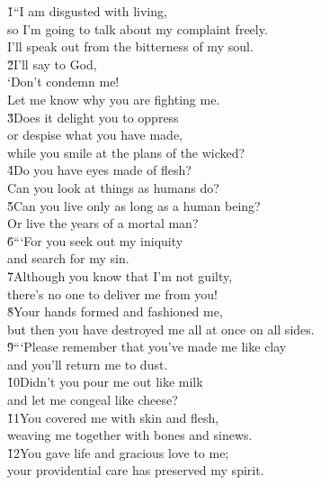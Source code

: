 \begin{poetry}
\poeml {}
\v{1}``I am disgusted with living, \\
\poemll    so I'm going to talk about my complaint freely. \\
\poemlll       I'll speak out from the bitterness of my soul. \\
\poeml \v{2}I'll say to God, \\
\poemll    `Don't condemn me! \\
\poemlll       Let me know why you are fighting me. \\
\poeml \v{3}Does it delight you to oppress \\
\poemll    or despise what you have made, \\
\poemlll       while you smile at the plans of the wicked? \\
\poeml \v{4}Do you have eyes made of flesh? \\
\poemll    Can you look at things as humans do? \\
\poeml \v{5}Can you live only as long as a human being? \\
\poemll    Or live the years of a mortal man? \\
\poeml \v{6}```For you seek out my iniquity \\
\poemll    and search for my sin. \\
\poeml \v{7}Although you know that I'm not guilty, \\
\poemll    there's no one to deliver me from you! \\
\poeml \v{8}Your hands formed and fashioned me, \\
\poemll    but then you have destroyed me all at once on all sides. \\
\poeml \v{9}```Please remember that you've made me like clay \\
\poemll    and you'll return me to dust. \\
\poeml \v{10}Didn't you pour me out like milk \\
\poemll    and let me congeal like cheese? \\
\poeml \v{11}You covered me with skin and flesh, \\
\poemll    weaving me together with bones and sinews. \\
\poeml \v{12}You gave life and gracious love to me; \\
\poemll    your providential care has preserved my spirit. \\

\end{poetry}
